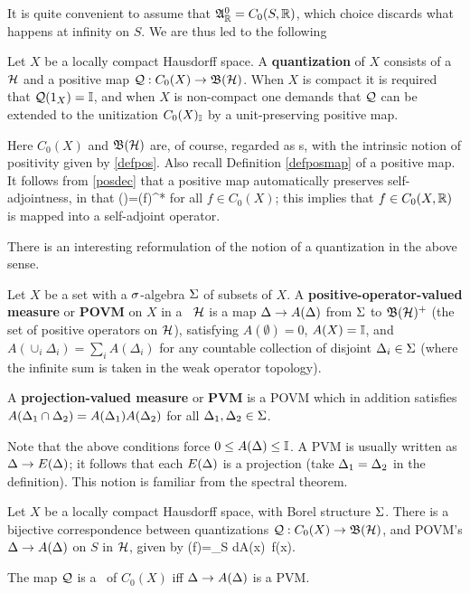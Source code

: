 It is quite convenient to assume that ${\frak A}_{\Bbb R}^0=C_0(S,{\Bbb R})$, which choice discards what happens
at infinity on $S$. We are thus led to the following
\begin{Definition}
Let $X$ be a locally compact Hausdorff space.  A {\bf quantization} of
$X$ consists of a \Hs\ ${\cal H}$ and a positive map ${\cal Q}:C_0(X)\rightarrow{\frak B}({\cal H})$.
When $X$ is compact it is required that ${\cal Q}(1_X)={\Bbb I}$, and when $X$ is
non-compact one demands that ${\cal Q}$ can be extended to the unitization
$C_0(X)_{{\Bbb I}}$ by a unit-preserving positive map.
\end{Definition}

Here $C_0(X)$ and ${\frak B}({\cal H})$ are, of course, regarded as \ca s, with the intrinsic notion of positivity
given by \ref{defpos}. Also recall Definition \ref{defposmap} of a positive map. 
It follows from \ref{posdec} that a positive map automatically preserves self-adjointness, in that
\be
\CQ()=\CQ(f)^*
\ee
for all $f\in C_0(X)$; this implies that $f\in C_0(X,{\Bbb R})$ is mapped into
 a self-adjoint operator.

There is an interesting reformulation of the notion of a quantization in the above sense.
\begin{Definition}
Let $X$ be a set with a $\sigma$-algebra $\Sigma$ of subsets of $X$.
A {\bf positive-operator-valued measure} or {\bf POVM} on $X$ in a \Hs\ ${\cal H}$ is 
 a map $\Delta \rightarrow A(\Delta)$ from $\Sigma$  to ${\frak B}({\cal H})^+$ (the set of
positive operators on ${\cal H}$), satisfying 
$A(\emptyset)=0$, $A(X)={\Bbb I}$, and
$A(\cup_i\Delta_i)=\sum_i A(\Delta_i)$ for any countable collection of 
disjoint $\Delta_i\in\Sigma$ (where
 the infinite sum is taken in the weak operator
topology).

A {\bf projection-valued measure} 
or {\bf PVM} is a POVM which in addition satisfies
$A(\Delta_1\cap\Delta_2)  =  A(\Delta_1)A(\Delta_2)$ for all $\Delta_1,\Delta_2\in\Sigma$.
\end{Definition}

Note that the above conditions force $0\leq A(\Delta)\leq {\Bbb I}$.
A PVM is usually written as $\Delta\rightarrow E(\Delta)$; it follows that each
$E(\Delta)$ is a projection (take $\Delta_1=\Delta_2$ in the definition). 
This notion is familiar from the spectral theorem.
\begin{Proposition}
Let $X$ be a locally compact Hausdorff space, with  Borel structure
$\Sigma$. There is a bijective correspondence between
quantizations ${\cal Q}:C_0(X)\rightarrow{\frak B}({\cal H})$, and POVM's  $\Delta \rightarrow A(\Delta)$ on $S$ in ${\cal H}$, given by
\be
\CQ(f)=\int_S dA(x)\, f(x). 
\ee

The map ${\cal Q}$ is a \rep\ of $C_0(X)$ iff $\Delta \rightarrow A(\Delta)$ is a PVM.
\end{Proposition}

